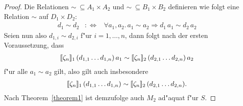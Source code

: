 \documentclass[12pt,a4paper]{article}
\begin{document}
\begin{proof}
  Die Relationen $\sim\ \subseteq A_1 \times A_2$ und $\sim\ \subseteq B_1 \times B_2$ definieren
  wie folgt eine Relation $\sim$ auf $D_1 \times D_2$:
  \[\begin{array}{rcl}
    d_1 \sim d_2
    &:\Leftrightarrow&
    \forall a_1,a_2.\,a_1 \sim a_2 \Rightarrow d_1\,a_1 \sim d_2\,a_2
  \end{array}\]
  Seien nun also $d_{1,i} \sim d_{2,i}$ f"ur $i=1,\ldots,n$, dann folgt nach der ersten Voraussetzung, dass
  \[\begin{array}{c}
      [\![\zeta_n]\!]_1\,(d_{1,1} \ldots d_{1,n})\,a_1
      \sim
      [\![\zeta_n]\!]_2\,(d_{2,1} \ldots d_{2,n})\,a_2
  \end{array}\]
  f"ur alle $a_1 \sim a_2$ gilt, also gilt auch insbesondere
  \[\begin{array}{c}
      [\![\zeta_n]\!]_1\,(d_{1,1} \ldots d_{1,n})
      \sim
      [\![\zeta_n]\!]_2\,(d_{2,1} \ldots d_{2,n}).
  \end{array}\]
  Nach Theorem~\ref{theorem1} ist demzufolge auch $M_2$ ad"aquat f"ur $S$.
\end{proof}
\end{document}
